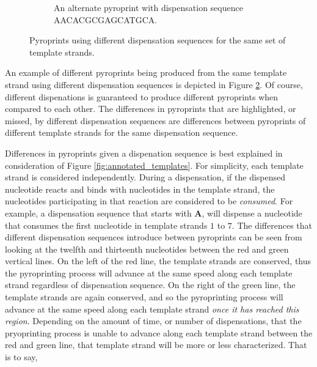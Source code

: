 \documentclass[12pt]{ucthesis}
\begin{document}
\begin{figure}[t]
\begin{subfigure}[t]{0.45\textwidth}
            \caption{An alternate pyroprint with dispensation sequence
                     AACACGCGAGCATGCA.}
            \label{fig:dispensation_example2}
         \end{subfigure}
         \caption{Pyroprints using different dispensation sequences for the same
                  set of template strands.}
         \label{fig:dispensation_examples}
      \end{figure}

      An example of different pyroprints being produced from the same template
      strand using different dispensation sequences is depicted in
      Figure \ref{fig:dispensation_examples}. Of course, different dispenations
      is guaranteed to produce different pyroprints when compared to each
      other. The differences in pyroprints that are highlighted, or missed, by
      different dispensation sequences are differences between pyroprints of
      different template strands for the same dispensation sequence.
      
      Differences in pyroprints given a dispenation sequence is best explained
      in consideration of Figure \ref{fig:annotated_templates}. For simplicity,
      each template strand is considered independently. During a dispensation,
      if the dispensed nucleotide reacts and binds with nucleotides in the
      template strand, the nucleotides participating in that reaction are
      considered to be \textit{consumed}. For example, a dispensation sequence
      that starts with \textbf{A}, will dispense a nucleotide that consumes the
      first nucleotide in template strands $1$ to $7$.  The differences
      that different dispensation sequences introduce between pyroprints can be
      seen from looking at the twelfth and thirteenth nucleotides between the
      red and green vertical lines. On the left of the red line, the template
      strands are conserved, thus the pyroprinting process will advance at
      the same speed along each template strand regardless of dispensation
      sequence. On the right of the green line, the template strands are again
      conserved, and so the pyroprinting process will advance at the same
      speed along each template strand \textit{once it has reached this
      region}. Depending on the amount of time, or number of dispensations,
      that the pryoprinting process is unable to advance along each template
      strand between the red and green line, that template strand will be more
      or less characterized. That is to say, 
\end{document}
